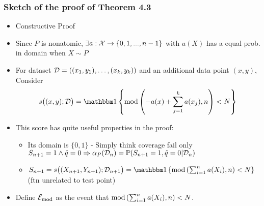 \documentclass[compress]{beamer}
\begin{document}
\begin{frame}\frametitle{Sketch of the proof of Theorem 4.3}
	\begin{itemize}
		\item Constructive Proof
		\item Since $P$ is nonatomic, $\exists a : \mathcal{X} \rightarrow \{0, 1, ..., n - 1\}$ with $a(X)$ has a equal prob. in domain when $X\sim P$
		\item For dataset $\mathcal{D} = ((x_1,y_1),\dots,(x_k,y_k))$ and an additional data point $(x,y)$, Consider
		\begin{align*}
			s\big((x,y);\cD\big) = \ind{\textnormal{mod}\left( -a(x) + \sum_{j=1}^k a(x_j)  , n \right) < N}
		\end{align*}
		\item This score has quite useful properties in the proof:
		\begin{itemize}  
			\item Its domain is $\{0, 1\}$ - Simply think coverage fail only $S_{n+1}=1 \land \hat{q} = 0 \Rightarrow \alpha_P (\mathcal{D}_n ) = \mathbb{P}(S_{n+1} = 1, \hat{q}=0|\mathcal{D}_n)$
			\item $S_{n+1} = s\big((X_{n+1},Y_{n+1});\cD_{n+1}\big) = \ind{\textnormal{mod}\left(  \sum_{i=1}^n a(X_i)  , n \right) < N}$ (ftn unrelated to test point)
		\end{itemize}
		\item Define $\mathcal{E}_{\textnormal{mod}}$ as the event that $\textnormal{mod}\left(\sum_{i=1}^n a(X_i)  , n \right) < N$. 
	\end{itemize}
\end{frame}
\end{document}
